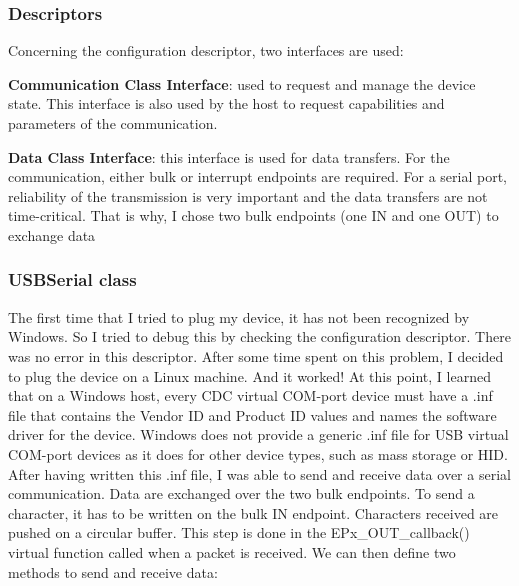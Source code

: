 \documentclass[pdftex,10pt,a4paper]{report}
\newenvironment{packed_item}{
\begin{itemize}
  \setlength{\itemsep}{1pt}
  \setlength{\parskip}{0pt}
  \setlength{\parsep}{0pt}
}{\end{itemize}}
\begin{document}
\subsubsection{Descriptors}
Concerning the configuration descriptor, two interfaces are used:
\begin{packed_item}
	\item \textbf{Communication Class Interface}: used to request and manage the device state. This interface is also used by the host to request capabilities and parameters of the communication. 
	\item \textbf{Data Class Interface}: this interface is used for data transfers. For the communication, either bulk or interrupt endpoints are required. For a serial port,  reliability
of the transmission is very important and the data transfers are not time-critical. That is why, I chose two bulk endpoints (one IN and one OUT) to exchange data
\end{packed_item}


\subsubsection{USBSerial class}
The first time that I tried to plug my device, it has not been recognized by Windows. So I tried to debug this by checking the configuration descriptor. There was no error in this descriptor. After some time spent on this problem, I decided to plug the device on a Linux machine. And it worked! At this point, I learned that on a Windows host, every CDC virtual COM-port device must have a .inf file that contains the Vendor ID and Product ID values and names the software driver for the device. Windows does not provide a generic .inf file for USB virtual COM-port devices as it does for other device types, such as mass storage or HID. \\

After having written this .inf file, I was able to send and receive data over a serial communication. Data are exchanged over the two bulk endpoints. To send a character, it has to be written  on the bulk IN endpoint. Characters received are pushed on a circular buffer. This step is done in the EPx\_OUT\_callback() virtual function called when a packet is received. We can then define two methods to send and receive data:
\end{document}
